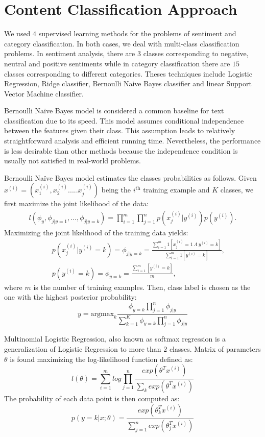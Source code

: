\section{Content Classification Approach}
\label{sec:approach}
We used $4$ supervised learning methods for the problems of sentiment and category classification.
In both cases, we deal with multi-class classification problems. In sentiment analysis, there are $3$ classes corresponding to negative, neutral and positive sentiments while in category classification there are $15$ classes corresponding to different categories.
Theses techniques include Logistic Regression, Ridge classifier, Bernoulli Naive Bayes classifier and linear Support Vector Machine classifier.

Bernoulli Naïve Bayes model is considered a common baseline for text classification due to its speed.
This model assumes conditional independence between the features given their class. This assumption leads to relatively straightforward analysis and efficient running time. Nevertheless, the performance is less desirable than other methods because the independence condition is usually not satisfied in real-world problems.

Bernoulli Naïve Bayes model estimates the classes probabilities as follows.
Given $x^{(i)}=(x_1^{(i)},x_2^{(i)}.....x_j^{(i)})$ being the $i^{\mathrm{th}}$ training example and $K$ classes, we first maximize the joint likelihood of the data:
\begin{eqnarray*}
l(\phi_y,\phi_{j|y=1},...,\phi_{j|y=k}) = \prod_{i = 1}^{m} \prod_{j = 1}^{n} p(x_j^{(i)}|y^{(i)})p(y^{(i)}).
\end{eqnarray*}
Maximizing the joint likelihood of the training data yields:
\begin{eqnarray*}
&&p(x_j^{(i)}|y^{(i)}=k) = \phi_{j|y=k}=\frac{\sum_{i = 1}^{m} 1 [x_j^{(i)} = 1 \: \Lambda \: y^{(i)}=k]}{\sum_{i = 1}^{m}1[y^{(i)}=k]}, \\
&&p(y^{(i)}=k) = \phi_{y=k} = \frac{\sum_{i = 1}^{m} [y^{(i)}=k]}{m},
\end{eqnarray*}
where $m$ is the number of training examples.
Then, class label is chosen as the one with the highest posterior probability:
\begin{equation*}
y = \mathrm{argmax}_k \frac{\phi_{y=k} \prod_{j = 1}^{n} \phi_{j|y}}{\sum_{k = 1}^{K} \phi_{y=k} \prod_{j = 1}^{n} \phi_{j|y}}
\end{equation*}

Multinomial Logistic Regression, also known as softmax regression is a generalization of Logistic Regression to more than $2$ classes.
Matrix of parameters $\theta$ is found maximizing the log-likelihood function defined as:
\begin{equation*}
	l(\theta) = \sum_{i = 1}^{m} log \prod_{j = 1}^{n} \frac{exp(\theta^Tx^{(i)})}{\sum_k exp(\theta^Tx^{(i)})}
\label{eq:softmax-likelihood}
\end{equation*}
The probability of each data point is then computed as:
\begin{equation*}
 p(y=k|x;\theta)=\frac{exp(\theta^T_k x^{(i)})}{\sum_{j = 1}^{n} exp(\theta_j^T x^{(i)})}
\label{eq:softmax-prob}
\end{equation*}


